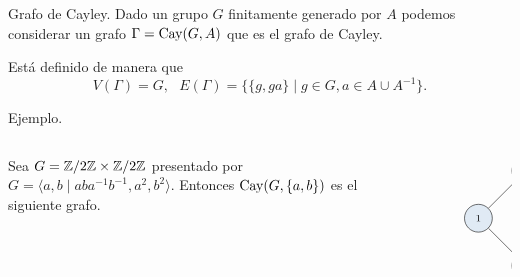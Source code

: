 \documentclass[aspectratio=169, 11pt]{beamer}
\begin{document}
	\begin{frame}[fragile]{Grafo de Cayley.}
		Dado un grupo $G$ finitamente generado por $A$ podemos considerar un grafo $\Gamma =\text{Cay}(G, A)$ que es el grafo de Cayley.

		Está definido de manera que 
		\[
			V(\Gamma) = G,   \ \ \ E(\Gamma) = \{ \{ g,ga \}  \mid g \in G, a \in A \cup A^{-1}  \}. 	
		\]

\begin{alertblock}{Ejemplo.}
	\begin{columns}
		\begin{column}{0.4\textwidth}
			Sea $G = \mathbb{Z}/2\mathbb{Z} \times \mathbb{Z}/2\mathbb{Z}$ presentado por 
			$G = \langle a,b \mid aba^{-1}b^{-1}, a^{2}, b^{2}\rangle$. Entonces $\text{Cay}(G, \{a,b\})$ es el siguiente grafo.
		\end{column}
		\begin{column}{0.6\textwidth}
			\[
				\begin{tikzpicture}
				[scale=0.60,V/.style = {circle, draw,align= center, minimum size=0.5cm,
					minimum size=2em,inner sep=2,
					 fill=astral!15,font=\scriptsize	},fill fraction/.style={path picture={
							\fill[#1] 
							(path picture bounding box.south) rectangle
							(path picture bounding box.north west);
					}},
					fill fraction/.default=astral!90
					]
			\node[align=center] at (2, -6) {};
				\begin{scope}[nodes=V,xshift=4.5cm, yshift=-4cm]
						\node (1) at (0,0) {$1$};
						\node (a) at (2,2)  {$a$};
						\node (b) at (2,-2)     {$b$};
						\node (ab) at (4,0)    {$ab$};
				\end{scope}
				
				\draw   (1)  edge[-] (a);
				\draw   (1)  edge[-] (b);
				\draw   (a)  edge[-] (ab);
				\draw   (b)  edge[-] (ab);
		\end{tikzpicture}
		\]
		\end{column}
	\end{columns}
	
			
	 \end{alertblock}
\end{frame}
	
\end{document}
